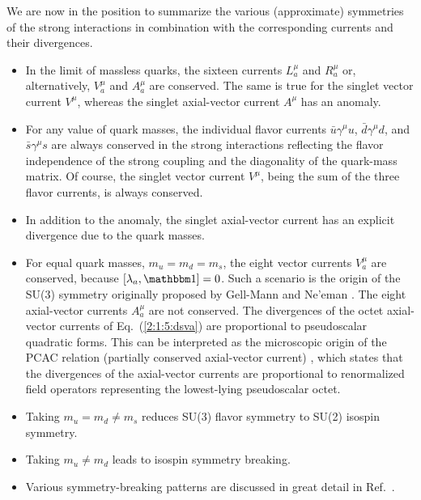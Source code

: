 \documentclass[twoside,12pt]{article}
\begin{document}
   We are now in the position to summarize the various (approximate)
symmetries of the strong interactions in combination with the corresponding
currents and their divergences.

\begin{itemize}
\item In the limit of massless quarks, the sixteen currents $L^\mu_a$
and $R^\mu_a$ or, alternatively, $V^\mu_a$ and $A^\mu_a$ are
conserved.
   The same is true for the singlet vector current $V^\mu$, whereas the
singlet axial-vector current $A^\mu$ has an anomaly.
\item For any value of quark masses, the individual flavor currents
$\bar{u}\gamma^\mu u$, $\bar{d}\gamma^\mu d$, and
$\bar{s}\gamma^\mu s$ are always conserved in the strong
interactions reflecting the flavor independence of the strong
coupling and the diagonality of the quark-mass matrix.
   Of course, the singlet vector current $V^\mu$, being the sum of
the three flavor currents, is always conserved.
\item In addition to the anomaly, the singlet axial-vector current
has an explicit divergence due to the quark masses.
\item For equal quark masses, $m_u=m_d=m_s$, the eight vector currents
$V^\mu_a$ are conserved, because $[\lambda_a,{\mathbbm 1}]=0$.
   Such a scenario is the origin of the SU(3) symmetry
originally proposed by Gell-Mann and Ne'eman
\cite{EightfoldWay:3:6}.
   The eight axial-vector currents $A^\mu_a$ are not conserved.
   The divergences of the octet axial-vector currents of Eq.\ (\ref{2:1:5:dsva})
are proportional to pseudoscalar quadratic forms.
   This can be interpreted as the microscopic origin of the
PCAC relation (partially conserved axial-vector current)
\cite{Gell-Mann:1964tf:3:6}, \cite{Adler:1968:3:6} which states that the
divergences of the axial-vector currents are proportional to
renormalized field operators representing the lowest-lying
pseudoscalar octet.
\item Taking $m_u=m_d\neq m_s$ reduces SU(3) flavor symmetry to SU(2) isospin symmetry.
\item Taking $m_u\neq m_d$ leads to isospin symmetry breaking.
\item Various symmetry-breaking patterns are discussed in great detail in
Ref.\ \cite{Pagels:1974se}.
\end{itemize}
\end{document}
